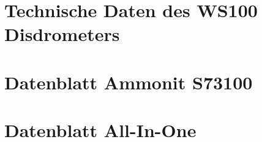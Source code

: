 \begin{appendix} %
\section{Technische Daten des WS100 Disdrometers}


\section{Datenblatt Ammonit S73100}


\section{Datenblatt All-In-One}

\end{appendix}